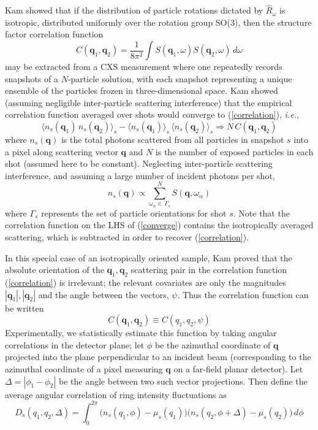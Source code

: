 \documentclass [11pt,fleqn]{article}
\def \be {\begin{equation}}
\def \ee {\end{equation}}
\begin{document}
Kam showed that if the distribution of particle rotations dictated by $\hat{R}_\omega$ is isotropic, distributed uniformly over the rotation group SO(3), then the structure factor correlation function
\be \label{correlation}
C(\bm q_1, \bm q_2) = \frac{1}{8 \pi^{2}}\int S( \bm q_{1},\omega ) S( \bm q_{2},\omega ) \, d \omega
\ee
may be extracted from a CXS measurement where one repeatedly records snapshots of a $N$-particle solution, with each snapshot representing a unique ensemble of the particles frozen in three-dimensional space. Kam showed (assuming negligible inter-particle scattering interference) that the empirical correlation function averaged over shots would converge to (\ref{correlation}), \textit{i.e.},
\be \label{converge}
\big \langle   n_s(\bm q_1)  \, n_s(\bm q_2) \big \rangle_s  - \big \langle {n}_s(\bm q_1) \big \rangle_s \, \big \langle {n}_s(\bm q_2) \big \rangle_s  \Rightarrow N \, C(\bm q_1, \bm q_2) 
\ee
where $n_s(\bm q)$ is the total photons scattered from all particles in snapshot $s$ into a pixel along scattering vector $\bm q$ and $N$ is the number of exposed particles in each shot (assumed here to be constant). Neglecting inter-particle scattering interference, and assuming a large number of incident photons per shot,
\be \label{photon}
n_s(\bm q) \propto \sum_{\omega_\alpha \in \,\Gamma_{s} }^N S(\bm q,\omega_\alpha)
 \ee
 where $\Gamma_{s}$ represents the set of particle orientations for shot $s$. Note that the correlation function on the LHS of (\ref{converge}) contains the isotropically averaged scattering, which is subtracted in order to recover (\ref{correlation}). 

In this special case of an isotropically oriented sample, Kam proved that the absolute orientation of the $\bm q_1, \bm q_2$ scattering pair in the correlation function (\ref{correlation}) is irrelevant; the relevant covariates are only the magnitudes $| \bm q_1 | , | \bm q_2 | $ and the angle between the vectors, $\psi$. Thus the correlation function can be written 
\[
C(\bm q_1, \bm q_2)  \equiv C (q_1,q_2, \psi  )
\]
Experimentally, we statistically estimate this function by taking angular correlations in the detector plane; let $\phi$ be the azimuthal coordinate of $\bm q$ projected into the plane perpendicular to an incident beam (corresponding to the azimuthal coordinate of a pixel measuring $\bm q$ on a far-field planar detector). Let $\Delta = |\phi_{1} - \phi_{2}|$ be the angle between two such vector projections. Then define the average angular correlation of ring intensity fluctuations as
\be \label{angular_shot}
D_s(q_1,q_2, \Delta  ) = \int_{0}^{2\pi}  \Big ( n_s(q_1,\phi) -   \mu_s( q_1) \Big) \Big ( n_s(q_2,\phi + \Delta) -   \mu_s( q_2) \Big)  \, d\phi  
\ee
\end{document}
